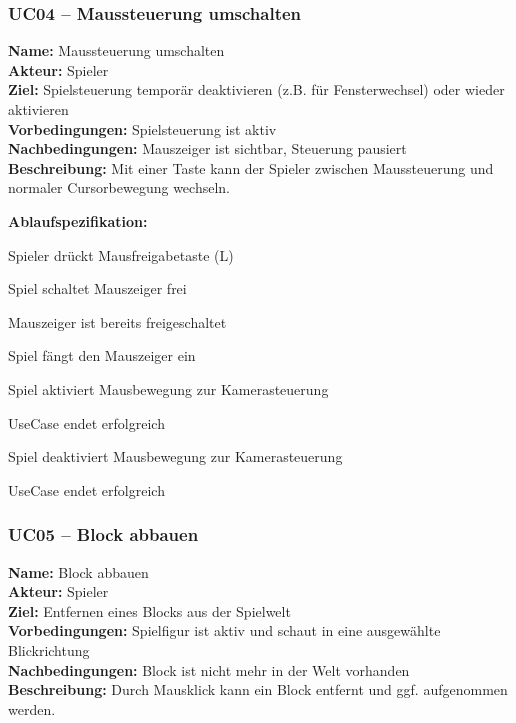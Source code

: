 \documentclass{article}
\begin{document}
\newpage

\subsubsection*{UC04 – Maussteuerung umschalten}

\textbf{Name:} Maussteuerung umschalten \\
\textbf{Akteur:} Spieler \\
\textbf{Ziel:} Spielsteuerung temporär deaktivieren (z.B. für Fensterwechsel) oder wieder aktivieren\\
\textbf{Vorbedingungen:} Spielsteuerung ist aktiv \\
\textbf{Nachbedingungen:} Mauszeiger ist sichtbar, Steuerung pausiert \\
\textbf{Beschreibung:} Mit einer Taste kann der Spieler zwischen Maussteuerung und normaler Cursorbewegung wechseln.

\textbf{Ablaufspezifikation:}
\begin{description}[style=nextline,leftmargin=1.9cm,labelwidth=1.6cm]
  \item[1.] Spieler drückt Mausfreigabetaste (L)
  \item[2.] Spiel schaltet Mauszeiger frei
  \item[2a.] Mauszeiger ist bereits freigeschaltet
  \item[2a.1.] Spiel fängt den Mauszeiger ein
  \item[2a.2.] Spiel aktiviert Mausbewegung zur  Kamerasteuerung
  \item[2a.3.] UseCase endet erfolgreich
  \item[3.] Spiel deaktiviert Mausbewegung zur Kamerasteuerung
  \item[4.] UseCase endet erfolgreich
\end{description}

\newpage

\subsubsection*{UC05 – Block abbauen}

\textbf{Name:} Block abbauen \\
\textbf{Akteur:} Spieler \\
\textbf{Ziel:} Entfernen eines Blocks aus der Spielwelt \\
\textbf{Vorbedingungen:} Spielfigur ist aktiv und schaut in eine ausgewählte Blickrichtung \\
\textbf{Nachbedingungen:} Block ist nicht mehr in der Welt vorhanden \\
\textbf{Beschreibung:} Durch Mausklick kann ein Block entfernt und ggf. aufgenommen werden.
\end{document}
